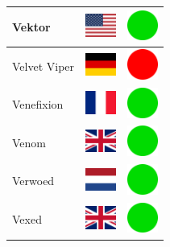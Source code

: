 \documentclass[12pt, a4paper, twoside]{report}
\begin{document}
\begin{center}
\begin{longtable}{|p{5cm}|p{2cm}|p{2cm}|}
 Vektor                                                     & \includegraphics[width=1cm]{../img/flags/us} &   \includegraphics[width=1cm]{../likes/y} \\ \hline
 Velvet Viper                                               & \includegraphics[width=1cm]{../img/flags/de} &   \includegraphics[width=1cm]{../likes/n} \\ \hline
 Venefixion                                                 & \includegraphics[width=1cm]{../img/flags/fr} &   \includegraphics[width=1cm]{../likes/y} \\ \hline
 Venom                                                      & \includegraphics[width=1cm]{../img/flags/gb} &   \includegraphics[width=1cm]{../likes/y} \\ \hline
 Verwoed                                                    & \includegraphics[width=1cm]{../img/flags/nl} &   \includegraphics[width=1cm]{../likes/y} \\ \hline
 Vexed                                                      & \includegraphics[width=1cm]{../img/flags/gb} &   \includegraphics[width=1cm]{../likes/y} \\ \hline

\end{longtable}
\end{center}
\end{document}
